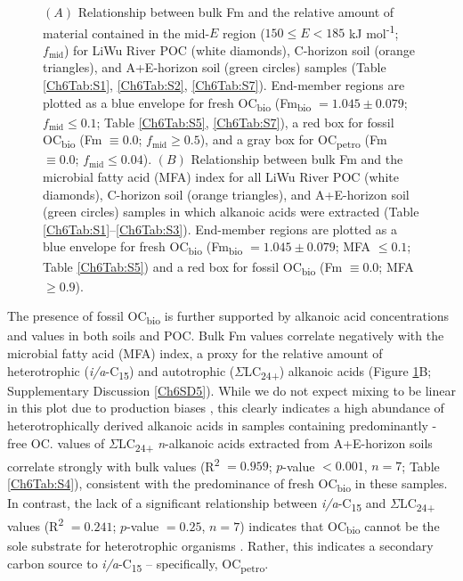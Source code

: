 \begin{figure}[p]
	\caption[$f_{\text{mid}}$ and alkanoic acid mixing plots]{$(A)$ Relationship between bulk Fm and the relative amount of material contained in the mid-$E$ region ($150 \leq E < 185$ kJ mol\textsuperscript{-1}; $f_{\text{mid}}$) for LiWu River POC (white diamonds), C-horizon soil (orange triangles), and A+E-horizon soil (green circles) samples (Table \ref{Ch6Tab:S1}, \ref{Ch6Tab:S2}, \ref{Ch6Tab:S7}). End-member regions are plotted as a blue envelope for fresh OC\textsubscript{bio} (Fm\textsubscript{bio} $= 1.045 \pm 0.079$; $f_{\text{mid}} \leq 0.1$; Table \ref{Ch6Tab:S5}, \ref{Ch6Tab:S7}), a red box for fossil OC\textsubscript{bio} (Fm $\equiv 0.0$; $f_{\text{mid}} \geq 0.5$), and a gray box for OC\textsubscript{petro} (Fm $\equiv 0.0$; $f_{\text{mid}} \leq 0.04$). $(B)$ Relationship between bulk Fm and the microbial fatty acid (MFA) index for all LiWu River POC (white diamonds), C-horizon soil (orange triangles), and A+E-horizon soil (green circles) samples in which alkanoic acids were extracted (Table \ref{Ch6Tab:S1}--\ref{Ch6Tab:S3}). End-member regions are plotted as a blue envelope for fresh OC\textsubscript{bio} (Fm\textsubscript{bio} $= 1.045 \pm 0.079$; MFA $\leq 0.1$; Table \ref{Ch6Tab:S5}) and a red box for fossil OC\textsubscript{bio} (Fm $\equiv 0.0$; MFA $\geq 0.9$).}
	\label{Ch6Fig:3} 
\end{figure}

The presence of fossil OC\textsubscript{bio} is further supported by alkanoic acid concentrations and  values in both soils and POC. Bulk Fm values correlate negatively with the microbial fatty acid (MFA) index, a proxy for the relative amount of heterotrophic (\textit{i/a}-C\textsubscript{15}) and autotrophic ($\Sigma$LC\textsubscript{24+}) alkanoic acids (Figure \ref{Ch6Fig:3}B; Supplementary Discussion \ref{Ch6SD5}). While we do not expect mixing to be linear in this plot due to production biases \citep{Hemingway:2016bq}, this clearly indicates a high abundance of heterotrophically derived alkanoic acids in samples containing predominantly -free OC.  values of $\Sigma$LC\textsubscript{24+} \textit{n}-alkanoic acids extracted from A+E-horizon soils correlate strongly with bulk  values (R\textsuperscript{2} $= 0.959$; $p$-value $< 0.001$, $n = 7$; Table \ref{Ch6Tab:S4}), consistent with the predominance of fresh OC\textsubscript{bio} in these samples. In contrast, the lack of a significant relationship between \textit{i/a}-C\textsubscript{15} and $\Sigma$LC\textsubscript{24+}  values (R\textsuperscript{2} $= 0.241$; $p$-value $= 0.25$, $n = 7$) indicates that OC\textsubscript{bio} cannot be the sole substrate for heterotrophic organisms \citep{Blair:1985ti}. Rather, this indicates a secondary carbon source to \textit{i/a}-C\textsubscript{15} -- specifically, OC\textsubscript{petro}.

